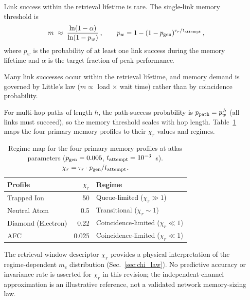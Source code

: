 \documentclass[quantumrep,article,submit,moreauthors]{Definitions/mdpi}
\begin{document}
\begin{description}[leftmargin=2em]
\item[\textbf{Coincidence-limited} ($\chi_r \ll 1$):] Link success within the retrieval lifetime is rare. The single-link memory threshold is
\begin{equation}
m \;\approx\; \frac{\ln(1-\alpha)}{\ln(1 - p_w)} \,, \qquad p_w = 1 - (1 - p_{\rm gen})^{\tau_r/t_{\rm attempt}} \,,
\label{eq:chi_coincidence}
\end{equation}
where $p_w$ is the probability of at least one link success during the memory lifetime and $\alpha$ is the target fraction of peak performance.
\item[\textbf{Queue-limited} ($\chi_r \gg 1$):] Many link successes occur within the retrieval lifetime, and memory demand is governed by Little's law ($m \propto$ load $\times$ wait time) rather than by coincidence probability.
\end{description}

For multi-hop paths of length $h$, the path-success probability is $p_{\rm path} = p_w^{\,h}$ (all links must succeed), so the memory threshold scales with hop length. Table~\ref{tab:chi_regimes} maps the four primary memory profiles to their $\chi_r$ values and regimes.

\begin{table}[htbp]
\centering
\caption{Regime map for the four primary memory profiles at atlas parameters ($p_{\rm gen}=0.005$, $t_{\rm attempt}=10^{-3}$~s). $\chi_r = \tau_r \cdot p_{\rm gen} / t_{\rm attempt}$.}
\label{tab:chi_regimes}
\begin{tabular}{lrl}
\toprule
Profile & $\chi_r$ & Regime \\
\midrule
Trapped Ion & 50 & Queue-limited ($\chi_r \gg 1$) \\
Neutral Atom & 0.5 & Transitional ($\chi_r \sim 1$) \\
Diamond (Electron) & 0.22 & Coincidence-limited ($\chi_r \ll 1$) \\
AFC & 0.025 & Coincidence-limited ($\chi_r \ll 1$) \\
\bottomrule
\end{tabular}
\end{table}

The retrieval-window descriptor $\chi_r$ provides a physical interpretation of the regime-dependent $m_c$ distribution (Sec.~\ref{sec:chi_law}). No predictive accuracy or invariance rate is asserted for $\chi_r$ in this revision; the independent-channel approximation is an illustrative reference, not a validated network memory-sizing law.
\end{document}
